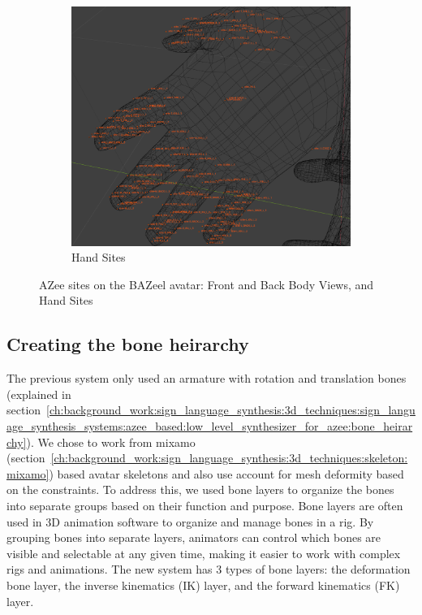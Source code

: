 \documentclass[../../main.tex]{subfiles}
\begin{document}
\begin{figure}[h]
\begin{subfigure}[b]{0.3\textwidth}
        \includegraphics[width=\textwidth]{chapters/avatar_creation_pose_synthesis/images/sites_hand.png}
        \caption{Hand Sites}
        \label{fig:sites_hand}
    \end{subfigure}
    \caption{AZee sites on the BAZeel avatar: Front and Back Body Views, and Hand Sites}
    \label{fig:sites_bazeel_combined}
\end{figure}

\subsection{Creating the bone heirarchy}
\label{ch:avatar_creation_pose_synthesis:proc_rig_signing_avatars:bone_layers}

The previous system only used an armature with rotation and translation bones (explained in section~\ref{ch:background_work:sign_language_synthesis:3d_techniques:sign_language_synthesis_systems:azee_based:low_level_synthesizer_for_azee:bone_heirarchy}). We chose to work from mixamo (section~\ref{ch:background_work:sign_language_synthesis:3d_techniques:skeleton:mixamo}) based avatar skeletons and also use account for mesh deformity based on the constraints. To address this, we used bone layers to organize the bones into separate groups based on their function and purpose. Bone layers are often used in 3D animation software to organize and manage bones in a rig. By grouping bones into separate layers, animators can control which bones are visible and selectable at any given time, making it easier to work with complex rigs and animations. The new system has 3 types of bone layers: the deformation bone layer, the inverse kinematics (IK) layer, and the forward kinematics (FK) layer.
\end{document}
